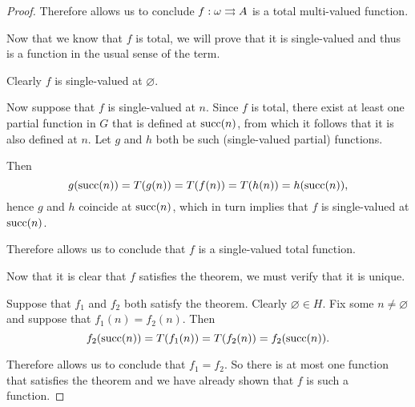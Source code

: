 \begin{proof}
  Therefore  allows us to conclude \( f: \omega \rightrightarrows A \) is a total multi-valued function.

   Now that we know that \( f \) is total, we will prove that it is single-valued and thus is a function in the usual sense of the term.

  Clearly \( f \) is single-valued at \( \varnothing \).

  Now suppose that \( f \) is single-valued at \( n \). Since \( f \) is total, there exist at least one partial function in \( G \) that is defined at \( \operatorname{succ}(n) \), from which it follows that it is also defined at \( n \).  Let \( g \) and \( h \) both be such (single-valued partial) functions.

  Then
  \begin{equation*}
    g(\operatorname{succ}(n)) = T(g(n)) = T(f(n)) = T(h(n)) = h(\operatorname{succ}(n)),
  \end{equation*}
  hence \( g \) and \( h \) coincide at \( \operatorname{succ}(n) \), which in turn implies that \( f \) is single-valued at \( \operatorname{succ}(n) \).

  Therefore  allows us to conclude that \( f \) is a single-valued total function.

   Now that it is clear that \( f \) satisfies the theorem, we must verify that it is unique.

  Suppose that \( f_1 \) and \( f_2 \) both satisfy the theorem. Clearly \( \varnothing \in H \). Fix some \( n \neq \varnothing \) and suppose that \( f_1(n) = f_2(n) \). Then
  \begin{equation*}
    f_2(\operatorname{succ}(n)) = T(f_1(n)) = T(f_2(n)) = f_2(\operatorname{succ}(n)).
  \end{equation*}

  Therefore  allows us to conclude that \( f_1 = f_2 \). So there is at most one function that satisfies the theorem and we have already shown that \( f \) is such a function.
\end{proof}

